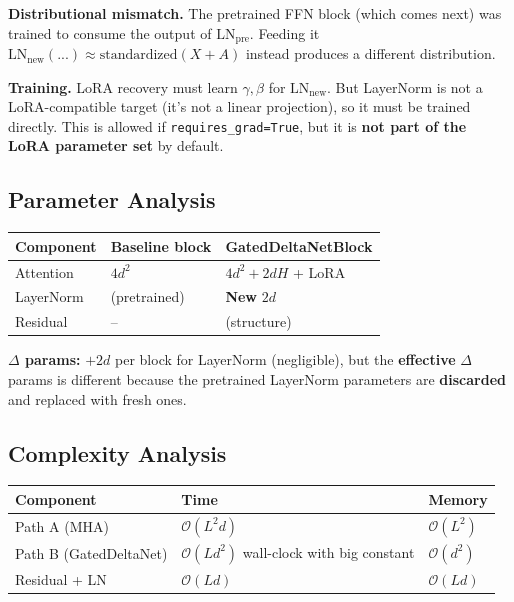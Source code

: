 \textbf{Distributional mismatch.} The pretrained FFN block (which comes next) was 
trained to consume the output of $\text{LN}_\text{pre}$. Feeding it 
$\text{LN}_\text{new}(...) \approx \text{standardized}(X + A)$ instead 
produces a different distribution.

\textbf{Training.} LoRA recovery must learn $\gamma, \beta$ for $\text{LN}_\text{new}$. 
But LayerNorm is not a LoRA-compatible target (it's not a linear projection), 
so it must be trained directly. This is allowed if \texttt{requires\_grad=True}, but 
it is \textbf{not part of the LoRA parameter set} by default.

\subsection{Parameter Analysis}

\begin{table}[H]
\centering
\small
\begin{tabular}{lll}
\toprule
\textbf{Component} & \textbf{Baseline block} & \textbf{GatedDeltaNetBlock} \\
\midrule
Attention & $4 d^2$ & $4 d^2 + 2 d H$ + LoRA \\
LayerNorm & (pretrained) & \textbf{New} $2d$ \\
Residual & -- & (structure) \\
\bottomrule
\end{tabular}
\end{table}

\textbf{$\Delta$ params:} $+2d$ per block for LayerNorm (negligible), but the \textbf{effective} 
$\Delta$ params is different because the pretrained LayerNorm parameters are 
\textbf{discarded} and replaced with fresh ones.

\subsection{Complexity Analysis}

\begin{table}[H]
\centering
\small
\begin{tabular}{lll}
\toprule
\textbf{Component} & \textbf{Time} & \textbf{Memory} \\
\midrule
Path A (MHA) & $\mathcal{O}(L^2 d)$ & $\mathcal{O}(L^2)$ \\
Path B (GatedDeltaNet) & $\mathcal{O}(L d^2)$ wall-clock with big constant & $\mathcal{O}(d^2)$ \\
Residual + LN & $\mathcal{O}(Ld)$ & $\mathcal{O}(Ld)$ \\
\bottomrule
\end{tabular}
\end{table}

